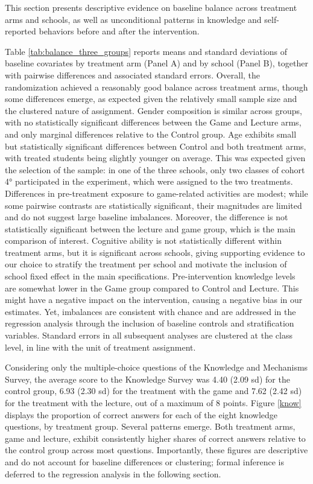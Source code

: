 \documentclass[preprint,12pt]{elsarticle}
\begin{document}


This section presents descriptive evidence on baseline balance across treatment arms and schools, as well as unconditional patterns in knowledge and self-reported behaviors before and after the intervention.


Table \ref{tab:balance_three_groups} reports means and standard deviations of baseline covariates by treatment arm (Panel A) and by school (Panel B), together with pairwise differences and associated standard errors.
Overall, the randomization achieved a reasonably good balance across treatment arms, though some differences emerge, as expected given the relatively small sample size and the clustered nature of assignment. Gender composition is similar across groups, with no statistically significant differences between the Game and Lecture arms, and only marginal differences relative to the Control group. Age exhibits small but statistically significant differences between Control and both treatment arms, with treated students being slightly younger on average. This was expected given the selection of the sample: in one of the three schools, only two classes of cohort 4° participated in the experiment, which were assigned to the two treatments. Differences in pre-treatment exposure to game-related activities are modest; while some pairwise contrasts are statistically significant, their magnitudes are limited and do not suggest large baseline imbalances. Moreover, the difference is not statistically significant between the lecture and game group, which is the main comparison of interest. Cognitive ability is not statistically different within treatment arms, but it is significant across schools, giving supporting evidence to our choice to stratify the treatment per school and motivate the inclusion of school fixed effect in the main specifications.
Pre-intervention knowledge levels are somewhat lower in the Game group compared to Control and Lecture. This might have a negative impact on the intervention, causing a negative bias in our estimates. Yet, imbalances are consistent with chance and are addressed in the regression analysis through the inclusion of baseline controls and stratification variables. Standard errors in all subsequent analyses are clustered at the class level, in line with the unit of treatment assignment.


Considering only the multiple-choice questions of the Knowledge and Mechanisms Survey, the average score to the Knowledge Survey was 4.40 (2.09 sd) for the control group, 6.93 (2.30 sd) for the treatment with the game and 7.62 (2.42 sd) for the treatment with the lecture, out of a maximum of 8 points.
Figure \ref{know} displays the proportion of correct answers for each of the eight knowledge questions, by treatment group. Several patterns emerge. Both treatment arms, game and lecture, exhibit consistently higher shares of correct answers relative to the control group across most questions. Importantly, these figures are descriptive and do not account for baseline differences or clustering; formal inference is deferred to the regression analysis in the following section.
\end{document}
